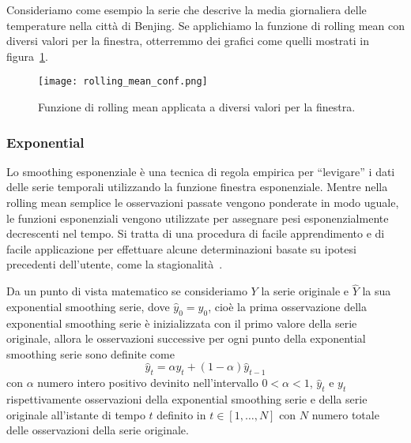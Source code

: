 \begin{esempio}
    Consideriamo come esempio la serie che descrive la media giornaliera delle temperature
    nella città di Benjing. Se applichiamo la funzione di rolling mean con diversi
    valori per la finestra, otterremmo dei grafici come quelli mostrati in figura~\ref*{fig:rolling_mean_conf}.
    
    \begin{figure}[H]
        \centering
        \texttt{[image: rolling\_mean\_conf.png]}
        \caption{Funzione di rolling mean applicata a diversi valori per la finestra.}
        \label{fig:rolling_mean_conf}
    \end{figure}

\end{esempio}




\subsubsection{Exponential}
Lo smoothing esponenziale è una tecnica di regola empirica 
per ``levigare'' i dati delle serie temporali utilizzando la funzione finestra esponenziale.
Mentre nella rolling mean semplice le osservazioni passate vengono ponderate 
in modo uguale, le funzioni esponenziali vengono utilizzate per assegnare 
pesi esponenzialmente decrescenti nel tempo. 
Si tratta di una procedura di facile apprendimento e di facile applicazione 
per effettuare alcune determinazioni basate su ipotesi precedenti dell'utente, 
come la stagionalità~\cite{wiki:exp_smot}.

Da un punto di vista matematico se consideriamo $Y$ la serie originale e $\hat{Y}$ la sua 
exponential smoothing serie, dove $\hat{y}_0 = y_0$, cioè la prima osservazione
della exponential smoothing serie è inizializzata con il primo valore della serie originale,
allora le osservazioni successive per ogni punto della exponential smoothing serie
sono definite come
\[ \hat{y}_t = \alpha y_t + (1 - \alpha)\hat{y}_{t-1}  \]
con $\alpha$ numero intero positivo devinito nell'intervallo $0 < \alpha < 1$,  $\hat{y}_t$
e $y_t$ rispettivamente osservazioni della exponential smoothing serie e della serie originale
all'istante di tempo $t$ definito in $t \in [1, \dots , N]$ con $N$ numero totale delle osservazioni
della serie originale.

